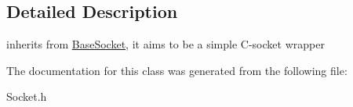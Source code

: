 \subsection{Detailed Description}
inherits from \hyperlink{classsocketpp_1_1BaseSocket}{BaseSocket}, it aims to be a simple C-socket wrapper 

The documentation for this class was generated from the following file:\begin{CompactItemize}
\item 
Socket.h\end{CompactItemize}
